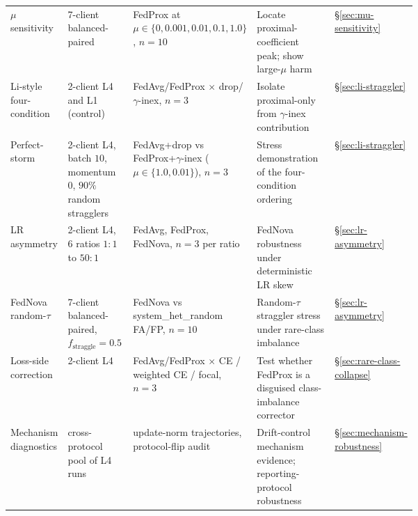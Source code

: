 \documentclass[11pt,a4paper]{report}
\begin{document}
\begin{table}[H]
{\begin{tabular}{l p{0.18\linewidth} p{0.22\linewidth} p{0.28\linewidth} l}
$\mu$ sensitivity                & 7-client balanced-paired                     & FedProx at $\mu \in \{0, 0.001, 0.01, 0.1, 1.0\}$, $n = 10$ & Locate proximal-coefficient peak; show large-$\mu$ harm                      & §\ref{sec:mu-sensitivity}                       \\
Li-style four-condition          & 2-client L4 and L1 (control)                 & FedAvg/FedProx $\times$ drop/$\gamma$-inex, $n = 3$       & Isolate proximal-only from $\gamma$-inex contribution                         & §\ref{sec:li-straggler}                         \\
Perfect-storm                    & 2-client L4, batch $10$, momentum $0$, $90\%$ random stragglers & FedAvg+drop vs FedProx+$\gamma$-inex ($\mu \in \{1.0, 0.01\}$), $n = 3$ & Stress demonstration of the four-condition ordering                        & §\ref{sec:li-straggler}                         \\
LR asymmetry                     & 2-client L4, 6 ratios $1{:}1$ to $50{:}1$    & FedAvg, FedProx, FedNova, $n = 3$ per ratio              & FedNova robustness under deterministic LR skew                                & §\ref{sec:lr-asymmetry}                         \\
FedNova random-$\tau$            & 7-client balanced-paired, $f_{\textrm{straggle}} = 0.5$ & FedNova vs system\_het\_random FA/FP, $n = 10$           & Random-$\tau$ straggler stress under rare-class imbalance             & §\ref{sec:lr-asymmetry}                         \\
Loss-side correction             & 2-client L4                                  & FedAvg/FedProx $\times$ CE / weighted CE / focal, $n = 3$ & Test whether FedProx is a disguised class-imbalance corrector                & §\ref{sec:rare-class-collapse}                  \\
Mechanism diagnostics            & cross-protocol pool of L4 runs               & update-norm trajectories, protocol-flip audit             & Drift-control mechanism evidence; reporting-protocol robustness               & §\ref{sec:mechanism-robustness}                  \\
\bottomrule
\end{tabular}%
}
\end{table}

\end{document}
